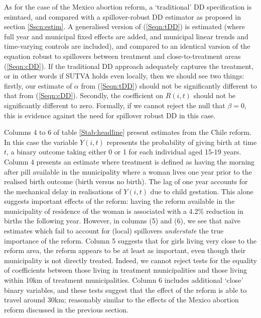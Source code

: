 \documentclass{article}
\begin{document}
\begin{spacing}{1.1}
As for the case of the Mexico abortion reform, a `traditional' DD specification
is esimtaed, and compared with a spillover-robust DD estimator as proposed in
section \ref{Sscn:estim}.  A generalised version of (\ref{Seqn:tDD}) is estimated
(where full year and municipal fixed effects are added, and municipal linear 
trends and time-varying controls are included), and compared to an identical
varsion of the equation robust to spillovers between treatment and 
close-to-treatment areas (\ref{Seqn:cDD}).  If the traditional DD approach 
adequately captures the treatment, or in other words if SUTVA holds even locally,
then we should see two things: firstly, our estimate of $\alpha$ from 
(\ref{Seqn:tDD}) should not be significantly different to that from (\ref{Seqn:cDD}).
Secondly, the coefficient on $R(i,t)$ should not be significantly different to
zero.  Formally, if we cannot reject the null that $\beta=0$, this is evidence 
against the need for spillover robust DD in this case.  

Columns 4 to 6 of table \ref{Stab:headline} present estimates from the Chile
reform.  In this case the variable $Y(i,t)$ represents the probability of giving
birth at time $t$, a binary outcome taking either 0 or 1 for each individual aged 
15-19 years. Column 4 presents an estimate where treatment is defined as having
the morning after pill available in the municipality where a woman lives one
year prior to the realised birth outcome (birth versus no birth).  The lag of
one year accounts for the mechanical delay in realisations of $Y(i,t)$ due to 
child gestation.  This alone suggests important effects of the reform: having the
reform available in the municipality of residence of the woman is associated with
a 4.2\% reduction in births the following year.  However, in columns (5) and (6),
we see that na\"ive estimates which fail to account for (local) spillovers 
\emph{understate} the true importance of the reform.  Column 5 suggests that
for girls living very close to the reform area, the reform appears to be at least
as important, even though their municipality is not directly treated.  Indeed,
we cannot reject tests for the equality of coefficients between those living
in treatment municipalities and those living within 10km of treatment 
municipalities.  Column 6 includes additional `close' binary variables, and
these tests suggest that the effect of the reform is able to travel around 30km;
reasonably similar to the effects of the Mexico abortion reform discussed in 
the previous section.


\end{spacing}
\end{document}
